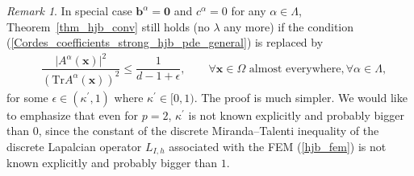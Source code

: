 \documentclass[12pt]{amsart}
\newcommand{\boldx}{\boldsymbol{x}}
\theoremstyle{definition}
\theoremstyle{remark}
\newtheorem{remark}[theorem]{Remark}
\begin{document}
\begin{remark}
\label{remark_hjb_conv}
In special case $\boldsymbol{b}^{\alpha} = \boldsymbol{0}$ and $c^{\alpha} = 0$ 
for any $\alpha \in \Lambda$, Theorem~\ref{thm_hjb_conv} still holds (no $\lambda$ any more)
if the condition (\ref{Cordes_coefficients_strong_hjb_pde_general}) is replaced by 
\begin{align}
\label{Cordes_coefficients_strong_hjb_fem_special}
& \dfrac{\vert A^{\alpha}(\boldx)\vert^{2}}{\left( 
\text{Tr}A^{\alpha}(\boldx) \right)^{2}} 
\leq \dfrac{1}{d -1 + \epsilon}, \qquad
\forall \boldx \in \Omega \text{ almost everywhere},
\forall \alpha \in \Lambda,
\end{align}
for some $\epsilon \in (\kappa^{\prime},1)$
where $\kappa^{\prime} \in [0,1)$. 
The proof is much simpler. We would like to emphasize that 
even for $p=2$, $\kappa^{\prime}$ is not known explicitly 
and probably bigger than $0$, since the constant of the discrete 
Miranda–Talenti inequality of the discrete Lapalcian operator $L_{I,h}$ 
associated with the FEM (\ref{hjb_fem}) is not known explicitly and probably bigger than $1$.
\end{remark}
\end{document}
